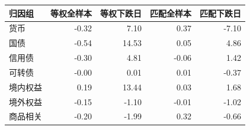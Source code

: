 \begin{tabular}{lrrrr}
\toprule
归因组 & 等权全样本 & 等权下跌日 & 匹配全样本 & 匹配下跌日\\\midrule
货币 & -0.32 & 7.10 & 0.37 & -7.10\\
国债 & -0.54 & 14.53 & 0.05 & 4.86\\
信用债 & -0.30 & 4.81 & -0.06 & 1.42\\
可转债 & -0.00 & 0.01 & 0.01 & -0.37\\
境内权益 & 0.19 & 13.44 & 0.03 & 1.68\\
境外权益 & -0.15 & -1.10 & -0.01 & -1.02\\
商品相关 & -0.20 & -1.99 & 0.32 & -0.66\\
\bottomrule
\end{tabular}